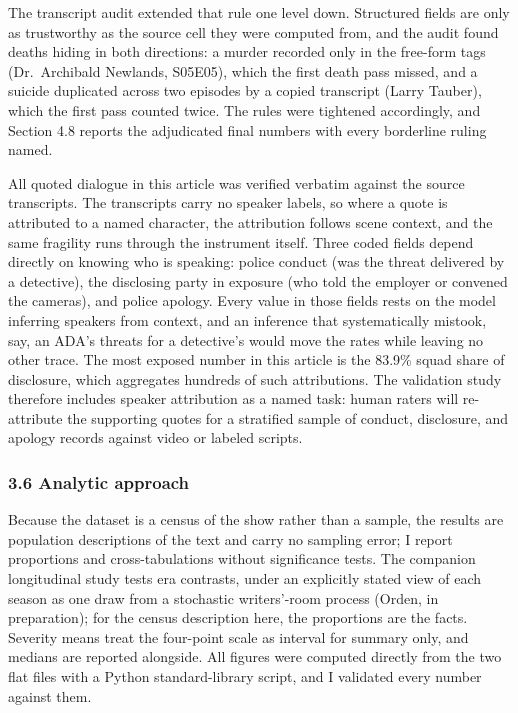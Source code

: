\documentclass[
]{article}
\begin{document}
The transcript audit extended that rule one level down. Structured
fields are only as trustworthy as the source cell they were computed
from, and the audit found deaths hiding in both directions: a murder
recorded only in the free-form tags (Dr.~Archibald Newlands, S05E05),
which the first death pass missed, and a suicide duplicated across two
episodes by a copied transcript (Larry Tauber), which the first pass
counted twice. The rules were tightened accordingly, and Section 4.8
reports the adjudicated final numbers with every borderline ruling
named.

All quoted dialogue in this article was verified verbatim against the
source transcripts. The transcripts carry no speaker labels, so where a
quote is attributed to a named character, the attribution follows scene
context, and the same fragility runs through the instrument itself.
Three coded fields depend directly on knowing who is speaking: police
conduct (was the threat delivered by a detective), the disclosing party
in exposure (who told the employer or convened the cameras), and police
apology. Every value in those fields rests on the model inferring
speakers from context, and an inference that systematically mistook,
say, an ADA's threats for a detective's would move the rates while
leaving no other trace. The most exposed number in this article is the
83.9\% squad share of disclosure, which aggregates hundreds of such
attributions. The validation study therefore includes speaker
attribution as a named task: human raters will re-attribute the
supporting quotes for a stratified sample of conduct, disclosure, and
apology records against video or labeled scripts.

\subsubsection{3.6 Analytic approach}\label{analytic-approach}

Because the dataset is a census of the show rather than a sample, the
results are population descriptions of the text and carry no sampling
error; I report proportions and cross-tabulations without significance
tests. The companion longitudinal study tests era contrasts, under an
explicitly stated view of each season as one draw from a stochastic
writers'-room process (Orden, in preparation); for the census
description here, the proportions are the facts. Severity means treat
the four-point scale as interval for summary only, and medians are
reported alongside. All figures were computed directly from the two flat
files with a Python standard-library script, and I validated every
number against them.
\end{document}
